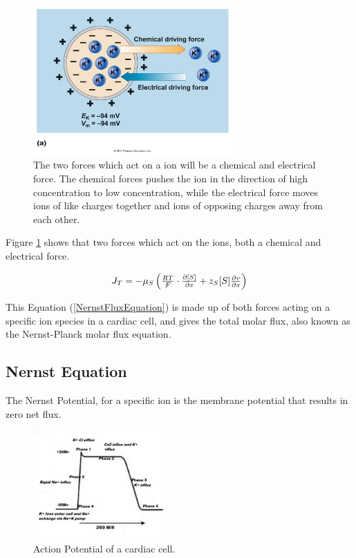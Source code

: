 \documentclass{bmcart}%
\begin{document}
 \begin{figure}[h!]
  \centering
  \includegraphics[width=3in]{forcesOnIons}
  \caption[cell circuit]
  {The two forces which act on a ion will be a chemical and electrical\\
  force. The chemical forces pushes the ion in the direction of high \\
  concentration to low concentration, while the electrical force moves\\
  ions of like charges together and ions of opposing charges away from \\
  each other. \cite{ForcesOnIons}}
\label{fig:IonForces}
\end{figure}

Figure \ref{fig:IonForces} shows that two forces which act on the ions, both a chemical and electrical force.

\begin{equation}
\\
$$
 J_T = -\mu_S \left( \frac{RT}{F} \cdot \frac{\partial [S]}{\partial x} + z_S [S] \frac{\partial v}{\partial x} \right)
$$
 \label{NernstFluxEquation}
\end{equation}

This Equation (\ref{NernstFluxEquation}) is made up of both forces acting on a specific ion species in a cardiac cell, and gives the total molar flux, also known as the Nernst-Planck molar flux equation.

\subsection*{Nernst Equation}

The Nernst Potential, for a specific ion is the membrane potential that results in zero net flux. 

 \begin{figure}[h!]
  \centering
  \includegraphics[width=2in]{ActionPotential}                                                              
  \caption[Action Potential]
  {Action Potential of a cardiac cell. \cite{ActionPoten2}}
\label{fig:ActionPotential}
\end{figure}
\end{document}
